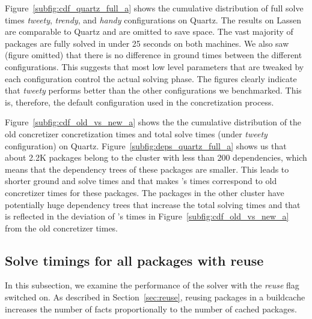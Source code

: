 Figure~\ref{subfig:cdf_quartz_full_a} shows the cumulative distribution of full solve
times \emph{tweety}, \emph{trendy}, and \emph{handy} configurations on Quartz. The
results on Lassen are comparable to Quartz and are omitted to save space. The vast
majority of packages are fully solved in under 25 seconds on both machines. We also saw
(figure omitted) that there is no difference in ground times between the different
configurations. This suggests that most low level parameters that are tweaked by each
configuration control the actual solving phase. The figures clearly indicate that
\emph{tweety} performs better than the other configurations we benchmarked. This is,
therefore, the default configuration used in the concretization process.

Figure~\ref{subfig:cdf_old_vs_new_a} shows the the cumulative distribution of the old
concretizer concretization times and \clingo{} total solve times (under \emph{tweety}
configuration) on Quartz. Figure~\ref{subfig:deps_quartz_full_a} shows us that about
2.2K packages belong to the cluster with less than 200 dependencies, which means that
the dependency trees of these packages are smaller. This leads to shorter ground and
solve times and that makes \clingo{}'s times correspond to old concretizer times for
these packages. The packages in the other cluster have potentially huge dependency trees
that increase the total solving times and that is reflected in the deviation of
\clingo{}'s times in Figure~\ref{subfig:cdf_old_vs_new_a} from the old concretizer
times.


\subsection{Solve timings for all packages with reuse}

In this subsection, we examine the performance of the solver with the \emph{reuse} flag
switched on. As described in Section~\ref{sec:reuse}, reusing packages in a buildcache
increases the number of facts proportionally to the number of cached packages.

% 

